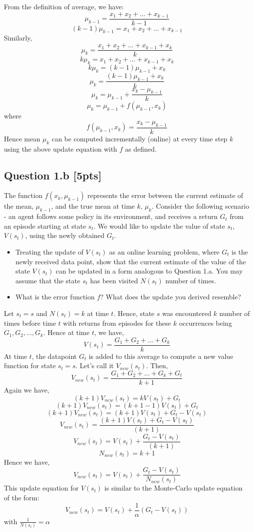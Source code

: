 \documentclass[12pt]{article}
\begin{document}
\noindent
\begin{solution}
From the definition of average, we have:
$$\mu_{k-1} = \frac{x_1 + x_2 + ... + x_{k-1} }{k-1}$$
$$(k-1)\mu_{k-1} = x_1 + x_2 + ... + x_{k-1}$$
Similarly, 
$$\mu_{k} = \frac{x_1 + x_2 + ... + x_{k-1} + x_k}{k}$$
$$k\mu_{k} = x_1 + x_2 + ... + x_{k-1} + x_k$$
$$k\mu_{k} = (k-1)\mu_{k-1} + x_k$$
$$\mu_{k} = \frac{(k-1)\mu_{k-1} + x_k}{k}$$
$$\mu_{k} = \mu_{k-1} + \frac{x_k - \mu_{k-1}}{k}$$
$$\mu_{k} = \mu_{k-1} + f(\mu_{k-1}, x_k)$$
where
$$f(\mu_{k-1}, x_k) = \frac{x_k - \mu_{k-1}}{k}$$
Hence mean $\mu_k$ can be computed  incrementally (online) at every time step $k$ using the above update equation with $f$ as defined.
\end{solution}

\pagebreak[4]

\subsection*{Question 1.b \textbf{[5pts]}}
The function $f(x_k, \mu_{k-1})$ represents the error between the current estimate of the mean, $\mu_{k-1}$, and the true mean at time $k$, $\mu_k$. Consider the following scenario - an agent follows some policy in its environment, and receives a return $G_t$ from an episode starting at state $s_t$. We would like to update the value of state $s_t$, $V(s_t)$, using the newly obtained $G_t$. 

\begin{itemize}
    \item Treating the update of $V(s_t)$ as an online learning problem, where $G_t$ is the newly received data point, show that the current estimate of the value of the state $V(s_t)$ can be updated in a form analogous to Question 1.a. You may assume that the state $s_t$ has been visited $N(s_t)$ number of times.
    
    \item What is the error function $f$? What does the update you derived resemble?  
\end{itemize}

\noindent
\begin{solution}
Let $s_t = s$ and $N(s_t) = k$ at time $t$. Hence, state $s$ was encountered $k$ number of times before time $t$ with returns from episodes for these $k$ occurrences being ${G_1, G_2, ... , G_k}$. Hence at time $t$, we have,
$$V(s_t) = \frac{G_1 + G_2 + ... + G_k}{k}$$
At time $t$, the datapoint $G_t$ is added to this average to compute a new value function for state $s_t = s$. Let's call it $V_{new}(s_t)$. Then,
$$V_{new}(s_t) = \frac{G_1 + G_2 + ... + G_k + G_t}{k+1}$$
Again we have,
$$(k+1)V_{new}(s_t) = kV(s_t) + G_t$$
$$(k+1)V_{new}(s_t) = (k + 1 - 1)V(s_t) + G_t$$
$$(k+1)V_{new}(s_t) = (k + 1)V(s_t) + G_t - V(s_t)$$
$$V_{new}(s_t) = \frac{(k + 1)V(s_t) + G_t - V(s_t)}{(k+1)}$$
$$V_{new}(s_t) = V(s_t) + \frac{G_t - V(s_t)}{(k+1)}$$
$$N_{new}(s_t) = k+1$$
Hence we have,
$$V_{new}(s_t) = V(s_t) + \frac{G_t - V(s_t)}{N_{new}(s_t)}$$
This update equation for $V(s_t)$ is similar to the Monte-Carlo update equation of the form:
$$V_{new}(s_t) = V(s_t) + \frac{1}{\alpha}(G_t - V(s_t))$$
with $\frac{1}{N(s_t)} = \alpha$
\end{solution}
\end{document}
